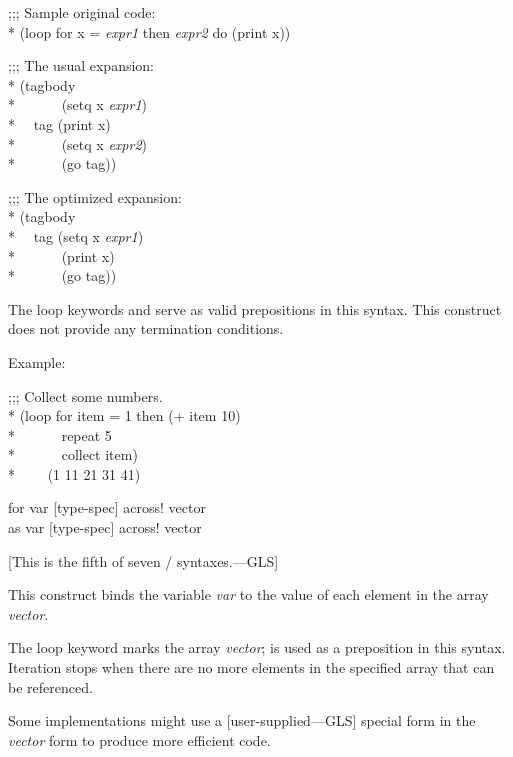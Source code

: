 \begin{new}
\begin{defloop}
\begin{lisp}
;;; Sample original code: \\*
(loop for x = {\it expr1\/} then {\it expr2\/} do (print x))
\end{lisp}
\begin{lisp}
;;; The usual expansion: \\*
(tagbody \\*
~~~~~~(setq x {\it expr1\/}) \\*
~~tag (print x) \\*
~~~~~~(setq x {\it expr2\/}) \\*
~~~~~~(go tag))
\end{lisp}
\begin{lisp}
;;; The optimized expansion: \\*
(tagbody \\*
~~tag (setq x {\it expr1\/}) \\*
~~~~~~(print x) \\*
~~~~~~(go tag))
\end{lisp}

The loop keywords \cd{=} and   serve as valid prepositions
in this syntax.
This construct does not provide any termination conditions.

Example:
\begin{lisp}
;;; Collect some numbers. \\*
(loop for item = 1 then (+ item 10) \\*
~~~~~~repeat 5 \\*
~~~~~~collect item) \\*
~~~\EV~(1 11 21 31 41)
\end{lisp}
\end{defloop}


\begin{defloop}
for var [type-spec] \!across! vector \\
as var [type-spec] \!across! vector

[This is the fifth of seven / syntaxes.---GLS]

    This construct binds the variable {\it var\/} to
    the value of each element in the array {\it vector}.

  The loop keyword  marks the array {\it vector}; 
  is used as a preposition in this syntax.
  Iteration stops when there are no more elements in the specified
  array that can be referenced.

  Some implementations might use a [user-supplied---GLS]  special form
  in the {\it vector} form to produce more efficient code.


\end{defloop}
\end{new}
